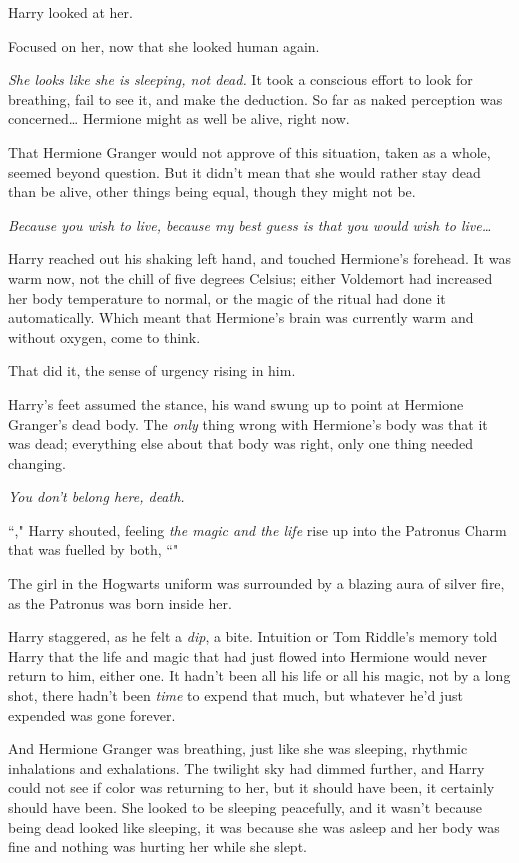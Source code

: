 Harry looked at her.

Focused on her, now that she looked human again.

\emph{She looks like she is sleeping, not dead.} It took a conscious effort to look for breathing, fail to see it, and make the deduction. So far as naked perception was concerned{\ldots} Hermione might as well be alive, right now.

That Hermione Granger would not approve of this situation, taken as a whole, seemed beyond question. But it didn't mean that she would rather stay dead than be alive, other things being equal, though they might not be.

\emph{Because you wish to live, because my best guess is that you would wish to live{\ldots}}

Harry reached out his shaking left hand, and touched Hermione's forehead. It was warm now, not the chill of five degrees Celsius; either Voldemort had increased her body temperature to normal, or the magic of the ritual had done it automatically. Which meant that Hermione's brain was currently warm and without oxygen, come to think.

That did it, the sense of urgency rising in him.

Harry's feet assumed the stance, his wand swung up to point at Hermione Granger's dead body. The \emph{only} thing wrong with Hermione's body was that it was dead; everything else about that body was right, only one thing needed changing.

\emph{You don't belong here, death.}

``," Harry shouted, feeling \emph{the magic and the life} rise up into the Patronus Charm that was fuelled by both, ``"

The girl in the Hogwarts uniform was surrounded by a blazing aura of silver fire, as the Patronus was born inside her.

Harry staggered, as he felt a \emph{dip}, a bite. Intuition or Tom Riddle's memory told Harry that the life and magic that had just flowed into Hermione would never return to him, either one. It hadn't been all his life or all his magic, not by a long shot, there hadn't been \emph{time} to expend that much, but whatever he'd just expended was gone forever.

And Hermione Granger was breathing, just like she was sleeping, rhythmic inhalations and exhalations. The twilight sky had dimmed further, and Harry could not see if color was returning to her, but it should have been, it certainly should have been. She looked to be sleeping peacefully, and it wasn't because being dead looked like sleeping, it was because she was asleep and her body was fine and nothing was hurting her while she slept.

